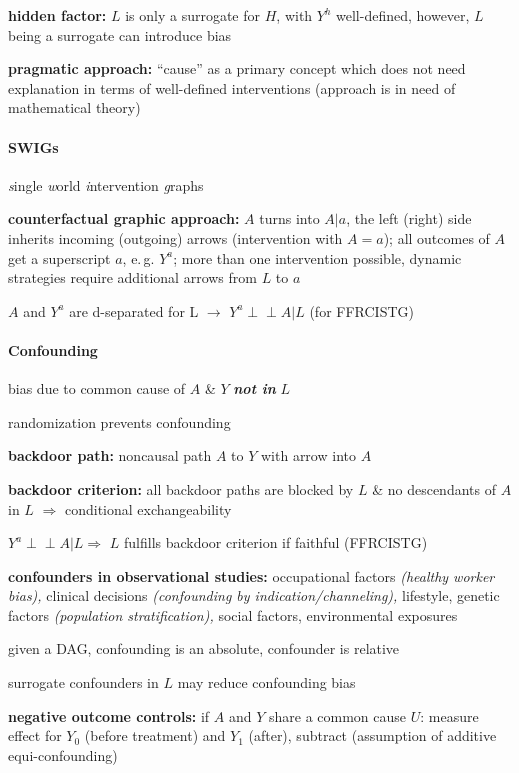 \documentclass[8pt,twoside]{extarticle}
\newcommand{\indep}{\perp \!\!\! \perp}
\begin{document}
\begin{multicols}{2}
 \textbf{hidden factor:} $L$ is only a surrogate for $H$, with $Y^h$ well-defined, however, $L$ being a surrogate can introduce bias

 \textbf{pragmatic approach:} ``cause'' as a primary concept which does not need explanation in terms of well-defined interventions (approach is in need of mathematical theory)



\paragraph{SWIGs} \textit{s}ingle \textit{w}orld \textit{i}ntervention \textit{g}raphs

 \textbf{counterfactual graphic approach:}
$A$ turns into $A|a$, the left (right) side inherits incoming (outgoing) arrows (intervention with $A=a$); all outcomes of $A$ get a superscript $a$, e.\,g. $Y^a$; more than one intervention possible, dynamic strategies require additional arrows from $L$ to $a$


 $A$ and $Y^a$ are d-separated  for L $\rightarrow$ $Y^a \indep A|L$ (for FFRCISTG)



\paragraph{Confounding} bias due to common cause of $A$ \& $Y$ \textbf{\textit{not in}} $L$

 randomization prevents confounding

 \textbf{backdoor path:} noncausal path $A$ to $Y$ with arrow into $A$

 \textbf{backdoor criterion:} all backdoor paths are blocked by $L$ \& no descendants of $A$ in $L$ $\Rightarrow$ conditional exchangeability

 $Y^a {\indep} A|L \Rightarrow$ $L$ fulfills backdoor criterion if faithful (FFRCISTG)



 \textbf{confounders in observational studies:} occupational factors \textit{(healthy worker bias),} clinical decisions \textit{(confounding by indication/channeling),} lifestyle, genetic factors \textit{(population stratification),} social factors, environmental exposures

 given a DAG, confounding is an absolute, confounder is relative

 surrogate confounders in $L$ may reduce confounding bias

 \textbf{negative outcome controls:} if $A$ and $Y$ share a common cause $U$: measure effect for $Y_0$ (before treatment) and $Y_1$ (after), subtract (assumption of additive equi-confounding)


\end{multicols}
\end{document}
